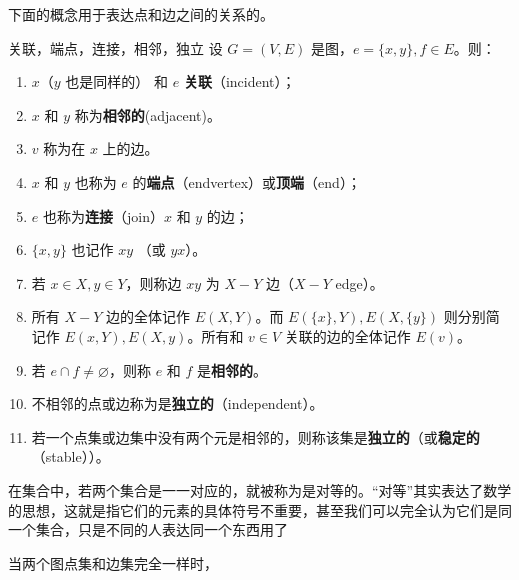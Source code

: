 下面的概念用于表达点和边之间的关系的。
\begin{definition}{关联，端点，连接，相邻，独立}
设 $G=(V,E)$ 是图，$e=\{x,y\},f\in E$。则：

 \begin{enumerate}
 \item $x$（$y$ 也是同样的） 和 $e$ \textbf{关联}（incident）；

   \item  $x$ 和 $y$ 称为\textbf{相邻的}(adjacent)。

   \item $v$ 称为在 $x$ 上的边。
  
   \item $x$ 和 $y$ 也称为 $e$ 的\textbf{端点}（endvertex）或\textbf{顶端}（end）；
  
  \item  $e$ 也称为\textbf{连接}（join）$x$ 和 $y$ 的边；

  \item  $\{x,y\}$ 也记作 $xy$ （或 $yx$）。
  
   \item 若 $x\in X,y\in Y$，则称边 $xy$ 为 $X-Y$ 边（$X-Y$ edge）。
  
   \item 所有 $X-Y$ 边的全体记作 $E(X,Y)$。而 $E(\{x\},Y),E(X,\{y\})$ 则分别简记作 $E(x,Y),E(X,y)$。所有和 $v\in V$ 关联的边的全体记作 $E(v)$。

   \item 若 $e\cap f\neq\varnothing$，则称 $e$ 和 $f$ 是\textbf{相邻的}。

   \item 不相邻的点或边称为是\textbf{独立的}（independent）。
   
   \item 若一个点集或边集中没有两个元是相邻的，则称该集是\textbf{独立的}（或\textbf{稳定的}（stable））。
 \end{enumerate}
\end{definition}

在集合中，若两个集合是一一对应的，就被称为是对等的。“对等”其实表达了数学的思想，这就是指它们的元素的具体符号不重要，甚至我们可以完全认为它们是同一个集合，只是不同的人表达同一个东西用了

当两个图点集和边集完全一样时，




